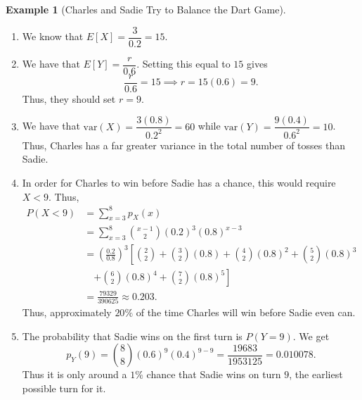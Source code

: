 \documentclass[
  letterpaper,
  DIV=11,
  numbers=noendperiod]{scrreprt}
\providecommand{\tightlist}{%
  \setlength{\itemsep}{0pt}\setlength{\parskip}{0pt}}\usepackage{longtable,booktabs,array}
\theoremstyle{definition}
\theoremstyle{definition}
\newtheorem{example}{Example}[chapter]
\theoremstyle{definition}
\theoremstyle{remark}
\begin{document}
\begin{example}[Charles and Sadie Try to Balance the Dart
Game]
\begin{tcolorbox}[enhanced jigsaw, colback=white, colframe=quarto-callout-color-frame, arc=.35mm, leftrule=.75mm, rightrule=.15mm, opacityback=0, breakable, bottomrule=.15mm, left=2mm, toprule=.15mm]
\begin{enumerate}
\def\labelenumi{\alph{enumi}.}
\tightlist
\item
  We know that \(E[X] = \dfrac{3}{0.2} = 15\).
\item
  We have that \(E[Y] = \dfrac{r}{0.6}\). Setting this equal to \(15\)
  gives \[\frac{r}{0.6} = 15 \implies r = 15(0.6) = 9.\] Thus, they
  should set \(r = 9\).
\item
  We have that \(\text{var}(X) = \dfrac{3(0.8)}{0.2^2} = 60\) while
  \(\text{var}(Y) = \dfrac{9(0.4)}{0.6^2} = 10\). Thus, Charles has a
  far greater variance in the total number of tosses than Sadie.
\item
  In order for Charles to win before Sadie has a chance, this would
  require \(X < 9\). Thus, \begin{align*}
  P(X < 9) &= \sum_{x=3}^8 p_X(x) \\
  &= \sum_{x=3}^8 \binom{x-1}{2}(0.2)^3(0.8)^{x-3} \\
  &= \left(\frac{0.2}{0.8}\right)^3\left[\binom{2}{2} + \binom{3}{2}(0.8) + \binom{4}{2}(0.8)^2 + \binom{5}{2}(0.8)^3 \right.\\
  &\quad\left.+ \binom{6}{2}(0.8)^4 + \binom{7}{2}(0.8)^5\right] \\
  &= \frac{79329}{390625} \approx 0.203.
  \end{align*} Thus, approximately \(20\%\) of the time Charles will win
  before Sadie even can.
\item
  The probability that Sadie wins on the first turn is \(P(Y = 9)\). We
  get
  \[p_Y(9) = \binom{8}{8}(0.6)^9(0.4)^{9-9} = \frac{19683}{1953125} = 0.010078.\]
  Thus it is only around a \(1\%\) chance that Sadie wins on turn \(9\),
  the earliest possible turn for it.
\end{enumerate}

\end{tcolorbox}

\end{example}
\end{document}
